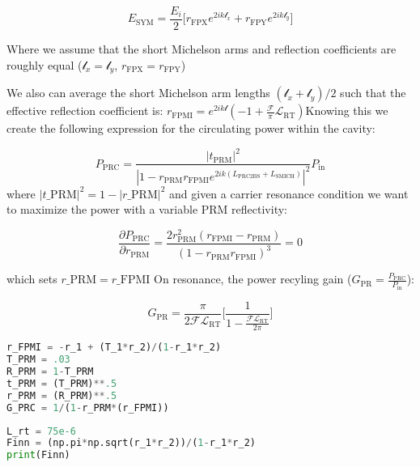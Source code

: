 \begin{equation} E_\mathrm{SYM}  = \frac{E_i}{2} \Big[ r_\mathrm{FPX}e^{2ik\mathscr{l}_x} + r_\mathrm{FPY}e^{2ik\mathscr{l}_y} \Big] \end{equation}

Where we assume that the short Michelson arms and reflection
coefficients are roughly equal (\(\mathscr{l}_x = \mathscr{l}_y\),
\(r_\mathrm{FPX} = r_\mathrm{FPY}\))

We also can average the short Michelson arm lengths
\((\mathscr{l}_x + \mathscr{l}_y)/2\) such that the effective reflection
coefficient is:
\(r_\mathrm{FPMI} = e^{2ik\mathscr{l}}(- 1 + \frac{\mathcal{F}}{\pi} \mathscr{L}_\mathrm{RT})\)Knowing
this we create the following expression for the circulating power within
the cavity:

\begin{equation} P_\mathrm{PRC} = \frac{|t_\mathrm{PRM}| ^2}{|1-r_\mathrm{PRM} r_\mathrm{FPMI} e^{2ik(L_\mathrm{PRC2BS} + L_\mathrm{SMICH})}| ^2} P_\mathrm{in}\end{equation} where
$ | t\_\mathrm{PRM} | ^2 = 1 - | r\_\mathrm{PRM} | ^ 2 $ and given a carrier resonance
condition we want to maximize the power with a variable PRM
reflectivity:

\begin{equation}\frac{\partial P_\mathrm{PRC}}{\partial r_\mathrm{PRM}} = \frac{2r_\mathrm{PRM}^2(r_\mathrm{FPMI} - r_\mathrm{PRM})}{(1 - r_\mathrm{PRM} r_\mathrm{FPMI})^3} = 0\end{equation}

which sets $ r\_\mathrm{PRM} = r\_\mathrm{FPMI} $ On resonance, the
power recyling gain
(\(G_\mathrm{PR} = \frac{P_\mathrm{PRC}}{P_\mathrm{in}}\)):

\begin{equation} G_\mathrm{PR} = \frac{\pi}{2 \mathcal{F} \mathscr{L}_\mathrm{RT}} \Bigg[ \frac{1}{1- \frac{\mathcal{F}\mathscr{L}_\mathrm{RT}}{2 \pi}} \Bigg] \end{equation}

\begin{spacing}{1}\begin{lstlisting}[frame=single, language=Python]
r_FPMI = -r_1 + (T_1*r_2)/(1-r_1*r_2)
T_PRM = .03
R_PRM = 1-T_PRM
t_PRM = (T_PRM)**.5
r_PRM = (R_PRM)**.5
G_PRC = 1/(1-r_PRM*(r_FPMI))
\end{lstlisting}\end{spacing}

\begin{spacing}{1}\begin{lstlisting}[frame=single, language=Python]
L_rt = 75e-6
Finn = (np.pi*np.sqrt(r_1*r_2))/(1-r_1*r_2)
print(Finn)
\end{lstlisting}\end{spacing}

